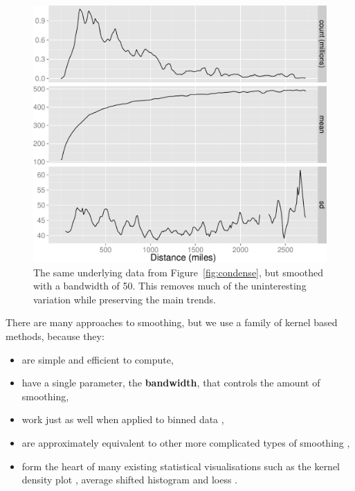 \documentclass[journal]{vgtc}                %
\begin{document}
\begin{figure}[htb]
 \centering
 \includegraphics[width=\linewidth]{smooth}
 \caption{The same underlying data from Figure~\ref{fig:condense}, but smoothed with a bandwidth of 50. This removes much of the uninteresting variation while preserving the main trends.}
 \label{fig:smooth}
\end{figure}

There are many approaches to smoothing, but we use a family of kernel based methods, because they:

\begin{itemize}
  \item are simple and efficient to compute,
  
  \item have a single parameter, the {\bf bandwidth}, that controls the amount of smoothing,

  \item work just as well when applied to binned data \cite{wand:1994},
  
  \item are approximately equivalent to other more complicated types of smoothing \citep{silverman:1984}, 
  
  \item form the heart of many existing statistical visualisations such as the kernel density plot \citep{scott:1992}, average shifted histogram \citep{scott:1985} and loess \citep{cleveland:1979}.

\end{itemize}
\end{document}
